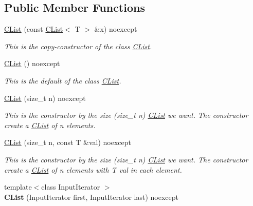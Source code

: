 \subsection*{Public Member Functions}
\begin{DoxyCompactItemize}
\item 
\hyperlink{classnsSdD_1_1CList_aad7088db9f8120c6e6c1a2f39022fa8f}{C\+List} (const \hyperlink{classnsSdD_1_1CList}{C\+List}$<$ T $>$ \&x) noexcept
\begin{DoxyCompactList}\small\item\em This is the copy-\/constructor of the class \hyperlink{classnsSdD_1_1CList}{C\+List}. \end{DoxyCompactList}\item 
\hyperlink{classnsSdD_1_1CList_ae319d81f9a81a4d4aa5427f013fe8dae}{C\+List} () noexcept
\begin{DoxyCompactList}\small\item\em This is the default of the class \hyperlink{classnsSdD_1_1CList}{C\+List}. \end{DoxyCompactList}\item 
\hyperlink{classnsSdD_1_1CList_a0dc3fc05ef1e765313814baf2be139c1}{C\+List} (size\+\_\+t n) noexcept
\begin{DoxyCompactList}\small\item\em This is the constructor by the size ({\ttfamily size\+\_\+t} n) \hyperlink{classnsSdD_1_1CList}{C\+List} we want. The constructor create a \hyperlink{classnsSdD_1_1CList}{C\+List} of n elements. \end{DoxyCompactList}\item 
\hyperlink{classnsSdD_1_1CList_a09fd13d9614defdb880fdab1ae0b33ca}{C\+List} (size\+\_\+t n, const T \&val) noexcept
\begin{DoxyCompactList}\small\item\em This is the constructor by the size ({\ttfamily size\+\_\+t} n) \hyperlink{classnsSdD_1_1CList}{C\+List} we want. The constructor create a \hyperlink{classnsSdD_1_1CList}{C\+List} of n elements with {\ttfamily T} val in each element. \end{DoxyCompactList}\item 
\hypertarget{classnsSdD_1_1CList_a6558a45c50021a28a54ea3e48fd1ed4b}{{\footnotesize template$<$class Input\+Iterator $>$ }\\{\bfseries C\+List} (Input\+Iterator first, Input\+Iterator last) noexcept}\label{classnsSdD_1_1CList_a6558a45c50021a28a54ea3e48fd1ed4b}


\end{DoxyCompactItemize}
